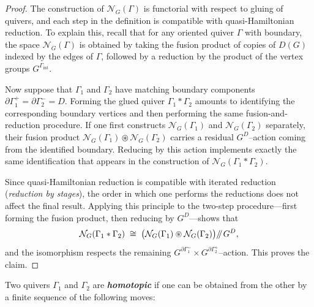 \documentclass[reqno]{amsart}
\theoremstyle{plain}
\theoremstyle{definition}
\newcommand{\defn}[1]{\textbf{\textit{#1}}}
\newcommand{\N}{\mathcal{N}}
\newcommand{\sll}[1]{\mkern-4mu\mathbin{/\mkern-5mu/}_{\mkern-4mu{#1}}}
\begin{document}
\begin{proof}
The construction of $\N_G(\Gamma)$ is functorial with respect to gluing of
quivers, and each step in the definition is compatible with quasi-Hamiltonian
reduction.  To explain this, recall that for any oriented quiver $\Gamma$ with
boundary, the space $\N_G(\Gamma)$ is obtained by taking the fusion product of
copies of $D(G)$ indexed by the edges of $\Gamma$, followed by a reduction by
the product of the vertex groups $G^{\Gamma_{\mathrm{int}}}$.

Now suppose that $\Gamma_1$ and $\Gamma_2$ have matching boundary components
$\partial\Gamma_1^+=\partial\Gamma_2^- = D$.  Forming the glued quiver
$\Gamma_1 * \Gamma_2$ amounts to identifying the corresponding boundary
vertices and then performing the same fusion-and-reduction procedure.  If one
first constructs $\N_G(\Gamma_1)$ and $\N_G(\Gamma_2)$ separately, their
fusion product $\N_G(\Gamma_1)\circledast \N_G(\Gamma_2)$ carries a residual
$G^D${--}action coming from the identified boundary.  Reducing by this action
implements exactly the same identification that appears in the construction of
$\N_G(\Gamma_1 * \Gamma_2)$.

Since quasi-Hamiltonian reduction is compatible with iterated reduction
(\emph{reduction by stages}), the order in which one performs the reductions
does not affect the final result.  Applying this principle to the two-step
procedure{---}first forming the fusion product, then reducing by $G^D${---}shows that
\[
\N_G(\Gamma_1 * \Gamma_2)
\;\cong\;
\bigl(\N_G(\Gamma_1)\circledast \N_G(\Gamma_2)\bigr)\sll{} G^D,
\]
and the isomorphism respects the remaining
$G^{\partial\Gamma_1^-}\times G^{\partial\Gamma_2^+}${--}action.  This proves the
claim.
\end{proof}


Two quivers $\Gamma_{1}$ and $\Gamma_2$ are \defn{homotopic} if one can be obtained from the other by a finite sequence of the following moves: 
\end{document}
